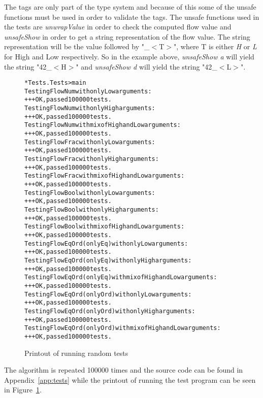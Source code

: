 The tags are only part of the type system and because of this some of the unsafe functions must be used in order to validate the tags. The unsafe functions used in the tests are \emph{unwrapValue} in order to check the computed flow value and \emph{unsafeShow} in order to get a string representation of the flow value. The string representation will be the value followed by "\_$<$T$>$", where T is either \emph{H} or \emph{L} for High and Low respectively. So in the example above, \emph{unsafeShow a} will yield the string "42\_$<$H$>$" and \emph{unsafeShow d} will yield the string "42\_$<$L$>$".

\begin{figure}[h]
  \begin{alltt}
    *Tests.Tests> main
    Testing FlowNum with only Low arguments:
    +++ OK, passed 100000 tests.
    Testing FlowNum with only High arguments:
    +++ OK, passed 100000 tests.
    Testing FlowNum with mix of High and Low arguments:
    +++ OK, passed 100000 tests.
    Testing FlowFrac with only Low arguments:
    +++ OK, passed 100000 tests.
    Testing FlowFrac with only High arguments:
    +++ OK, passed 100000 tests.
    Testing FlowFrac with mix of High and Low arguments:
    +++ OK, passed 100000 tests.
    Testing FlowBool with only Low arguments:
    +++ OK, passed 100000 tests.
    Testing FlowBool with only High arguments:
    +++ OK, passed 100000 tests.
    Testing FlowBool with mix of High and Low arguments:
    +++ OK, passed 100000 tests.
    Testing FlowEqOrd (only Eq) with only Low arguments:
    +++ OK, passed 100000 tests.
    Testing FlowEqOrd (only Eq) with only High arguments:
    +++ OK, passed 100000 tests.
    Testing FlowEqOrd (only Eq) with mix of High and Low arguments:
    +++ OK, passed 100000 tests.
    Testing FlowEqOrd (only Ord) with only Low arguments:
    +++ OK, passed 100000 tests.
    Testing FlowEqOrd (only Ord) with only High arguments:
    +++ OK, passed 100000 tests.
    Testing FlowEqOrd (only Ord) with mix of High and Low arguments:
    +++ OK, passed 100000 tests.
  \end{alltt}
  \caption{Printout of running random tests}
  \label{fig:tests}
\end{figure}
The algorithm is repeated 100000 times and the source code can be found in Appendix~\ref{app:tests} while the printout of running the test program can be seen in Figure~\ref{fig:tests}.

